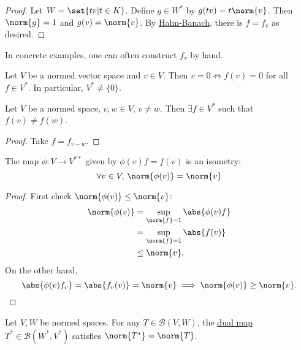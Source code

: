 \documentclass{article}
\begin{document}
\begin{proof}
    Let $W = \set{t v | t \in K}$.
    Define $g \in W^*$ by $g(tv) = t \norm{v}$. Then $\norm{g} = 1$ and $g(v) = \norm{v}$.
    By \hyperlink{thm:hahnBanach}{Hahn-Banach}, there is $f = f_v$ as desired.
\end{proof}

\begin{remark}
    In concrete examples, one can often construct $f_v$ by hand.
\end{remark}

\begin{cor}
    Let $V$ be a normed vector space and $v \in V$.
    Then $v = 0 \iff f(v) = 0$ for all $f \in V^*$.
    In particular, $V^* \neq \{0\}$.
\end{cor}

\begin{cor}
    Let $V$ be a normed space, $v, w \in V$, $v \neq w$. Then $\exists f \in V^*$ such that $f(v) \neq f(w)$.
\end{cor}

\begin{proof}
    Take $f = f_{v - w}$.
\end{proof}

\begin{cor}
    The map $\phi: V \to V^{**}$ given by $\phi(v) f = f(v)$ is an isometry:
    \begin{equation*}
        \forall v \in V, \, \norm{\phi(v)} = \norm{v}
    \end{equation*}
\end{cor}

\begin{proof}
    First check $\norm{\phi(v)} \leq \norm{v}$:
    \begin{align*}
        \norm{\phi(v)} &= \sup_{\norm{f} = 1} \abs{\phi(v) f} \\
                       &= \sup_{\norm{f} = 1} \abs{f(v)} \\
                       &\leq \norm{v}.
    \end{align*}
    On the other hand,
    \begin{equation*}
        \abs{\phi(v) f_v} = \abs{f_v(v)} = \norm{v} \implies \norm{\phi(v)} \geq \norm{v}.\qedhere
    \end{equation*}
\end{proof}

\begin{cor}
    Let $V, W$ be normed spaces.
    For any $T \in \mathcal{B}(V, W)$, the \hyperlink{def:dualMap}{dual map} $T^* \in \mathcal{B}(W^*, V^*)$ satisfies $\norm{T^*} = \norm{T}$.
\end{cor}
\end{document}
